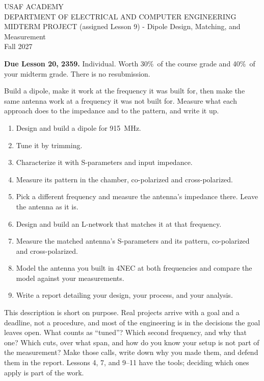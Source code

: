 \documentclass{exam}
\def\thisterm{\thisTermIn}
\def\thisterm{Fall 2027}
\def\fOne{915}
\def\duedate{Lesson 20, 2359}
\def\projweight{30\%}
\def\midweight{40\%}
\newcommand{\head}[1]{\par\vspace{6pt}{\large\bfseries #1}\par\vspace{-2pt}}
\begin{document}
\pagestyle{headandfoot}

\begin{center}
USAF ACADEMY \\
DEPARTMENT OF ELECTRICAL AND COMPUTER ENGINEERING \\
MIDTERM PROJECT (assigned Lesson 9) - Dipole Design, Matching, and Measurement \\
\thisterm \\[2mm]
\end{center}

\textbf{Due \duedate.} Individual. Worth \projweight\ of the course grade and
\midweight\ of your midterm grade. There is no resubmission.

\head{The Assignment}

Build a dipole, make it work at the frequency it was built for, then make the
same antenna work at a frequency it was not built for. Measure what each
approach does to the impedance and to the pattern, and write it up.

\begin{enumerate}[nosep]
	\item Design and build a dipole for \fOne\ MHz.
	\item Tune it by trimming.
	\item Characterize it with S-parameters and input impedance.
	\item Measure its pattern in the chamber, co-polarized and cross-polarized.
	\item Pick a different frequency and measure the antenna's impedance there.
	      Leave the antenna as it is.
	\item Design and build an L-network that matches it at that frequency.
	\item Measure the matched antenna's S-parameters and its pattern, co-polarized
	      and cross-polarized.
	\item Model the antenna you built in 4NEC at both frequencies and compare the
	      model against your measurements.
	\item Write a report detailing your design, your process, and your analysis.
\end{enumerate}

\head{What Is Up to You}

This description is short on purpose. Real projects arrive with a goal and a
deadline, not a procedure, and most of the engineering is in the decisions the
goal leaves open. What counts as ``tuned''? Which second frequency, and why that
one? Which cuts, over what span, and how do you know your setup is not part of
the measurement? Make those calls, write down why you made them, and defend
them in the report. Lessons 4, 7, and 9--11 have the tools; deciding which ones
apply is part of the work.
\end{document}
